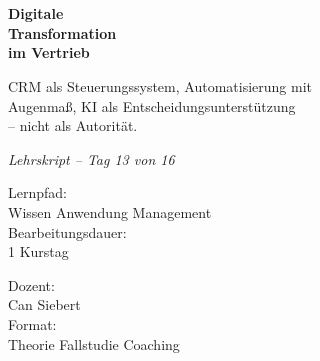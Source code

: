 \documentclass[11pt,a4paper,oneside]{article}
\newcommand{\caveatfontfallback}{\itshape}
\newcommand\caveatfont{\caveatfontfallback}%
\begin{document}
\begin{titlepage}
  \pagestyle{empty}
  \vspace*{1.5cm}
  \\[2pt]
  \noindent{\color{lpAccent}\rule{\linewidth}{1.2pt}}\\[4pt]

  \vspace{3cm}
  {\sffamily\fontsize{30}{34}\selectfont\bfseries\color{lpInk}Digitale\\Transformation\\im Vertrieb\par}

  \vspace{0.7cm}
  {\sffamily\large\color{lpGray}CRM als Steuerungssystem, Automatisierung mit\\Augenmaß, KI als Entscheidungsunterstützung\\-- nicht als Autorität.\par}

  \vspace{1.5cm}
  {\caveatfont\LARGE\color{lpAmber}Lehrskript -- Tag 13 von 16}\par

  \vfill

  \noindent\begin{minipage}{0.55\linewidth}
    {\sffamily\footnotesize\color{lpGray}Lernpfad:}\\
    {\sffamily\small\color{lpInk}Wissen \textrightarrow{} Anwendung \textrightarrow{} Management}\\[10pt]
    {\sffamily\footnotesize\color{lpGray}Bearbeitungsdauer:}\\
    {\sffamily\small\color{lpInk}1 Kurstag}
  \end{minipage}\hfill
  \begin{minipage}{0.4\linewidth}
    \raggedleft
    {\sffamily\footnotesize\color{lpGray}Dozent:}\\
    {\sffamily\small\color{lpInk}Can Siebert}\\[10pt]
    {\sffamily\footnotesize\color{lpGray}Format:}\\
    {\sffamily\small\color{lpInk}Theorie \textperiodcentered{} Fallstudie \textperiodcentered{} Coaching}
  \end{minipage}

  \vspace{0.5cm}
  \noindent{\color{lpAccent}\rule{\linewidth}{0.6pt}}
\end{titlepage}
\end{document}
